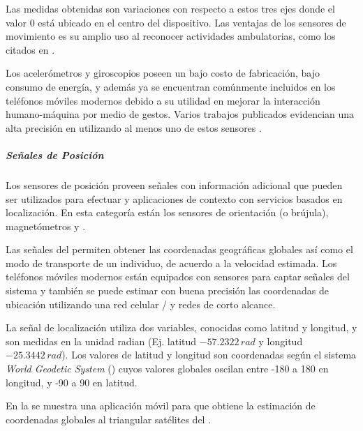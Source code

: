 Las medidas obtenidas son variaciones con respecto a estos tres ejes
donde el valor $0$ está ubicado en el centro del dispositivo. Las
ventajas de los sensores de movimiento es su amplio uso al reconocer
actividades ambulatorias, como los citados en \cite{Bao2004,Kwapisz2011,ReyesOrtiz2015}. 

Los acelerómetros y giroscopios poseen un bajo costo de fabricación,
bajo consumo de energía, y además ya se encuentran comúnmente incluidos
en los teléfonos móviles modernos \cite{Google2016s} debido a su
utilidad en mejorar la interacción humano-máquina por medio de gestos.
Varios trabajos publicados evidencian una alta precisión en 
utilizando al menos uno de estos sensores \cite{Bao2004,LaraLabrador2012}.

\subparagraph{Señales de Posición}

Los sensores de posición proveen señales con información adicional
que pueden ser utilizados para efectuar  y aplicaciones
de contexto con servicios basados en localización. En esta categoría
están los sensores de orientación (o brújula), magnetómetros y 
\cite{Google2016s}.

Las señales del  permiten obtener las coordenadas geográficas
globales así como el modo de transporte de un individuo, de acuerdo
a la velocidad estimada. Los teléfonos móviles modernos están equipados
con sensores para captar señales del sistema  y también
se puede estimar con buena precisión las coordenadas de ubicación
utilizando una red celular / y redes 
de corto alcance. 

La señal de localización utiliza dos variables, conocidas como latitud
y longitud, y son medidas en la unidad radian (Ej. latitud $-57.2322\,rad$
y longitud $-25.3442\,rad$). Los valores de latitud y longitud son
coordenadas según el sistema \emph{World Geodetic System} ()
cuyos valores globales oscilan entre -180 a 180 en longitud, y -90
a 90 en latitud.

En la  se muestra una aplicación móvil para \emph{}
que obtiene la estimación de coordenadas globales al triangular satélites
del . 

